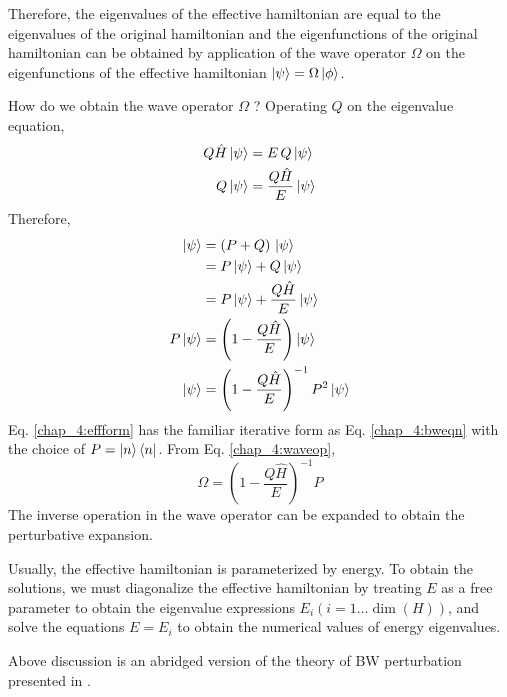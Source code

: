 Therefore, the eigenvalues of the effective hamiltonian are equal to the eigenvalues of the original hamiltonian and the 
eigenfunctions of the original hamiltonian can be obtained by application of the wave operator $\Omega$ on the eigenfunctions of
the effective hamiltonian $\ket{\psi} = \Omega\ket{\phi}$.

How do we obtain the wave operator $\Omega$ ? Operating $Q$ on the eigenvalue equation,
\begin{align*}
 Q\hat{H}\ket{\psi} &= E\,Q\ket{\psi} \\
 Q\ket{\psi} &= \frac{Q\hat{H}}{E}\ket{\psi}
\end{align*}
Therefore,
\begin{align}
  \ket{\psi} &= (P + Q)\,\ket{\psi} \nonumber \\
  &= P\ket{\psi} + Q\ket{\psi} \nonumber \\
  \label{chap_4:effform} &= P\ket{\psi} + \frac{Q\hat{H}}{E}\ket{\psi} \\
  P\ket{\psi} &= \left(1-\frac{Q\hat{H}}{E}\right)\ket{\psi} \nonumber \\
  \label{chap_4:waveop} \ket{\psi} &= \left(1-\frac{Q\hat{H}}{E}\right)^{-1} P^2 \ket{\psi}  
\end{align} Eq. \eqref{chap_4:effform} has the familiar iterative form as Eq. \eqref{chap_4:bweqn} with the choice of 
$P = \ket{n}\bra{n}$. From Eq. \eqref{chap_4:waveop}, 
\begin{equation}
 \Omega = \left(1-\frac{Q\hat{H}}{E}\right)^{-1}P
\end{equation}
The inverse operation in the wave operator can be expanded to obtain the perturbative expansion.

Usually, the effective hamiltonian is parameterized by energy. To obtain the solutions, we must diagonalize the effective hamiltonian by treating $E$ as a free parameter to
obtain the eigenvalue expressions $E_{i} (i=1\dots \dim(H))$, and solve the equations $E = E_{i}$ to obtain the numerical values of energy eigenvalues.

Above discussion is an abridged version of the theory of BW perturbation presented in \parencite{wilson2009brillouin}.
